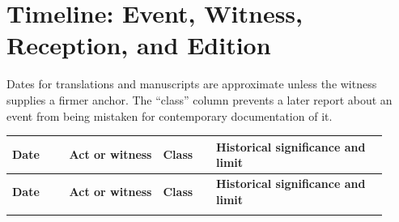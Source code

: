\section{Timeline: Event, Witness, Reception, and Edition}

Dates for translations and manuscripts are approximate unless the witness supplies a firmer anchor. The “class” column prevents a later report about an event from being mistaken for contemporary documentation of it.

\begin{longtable}{>{\bfseries\RaggedRight\arraybackslash}p{0.14\linewidth}>{\RaggedRight\arraybackslash}p{0.23\linewidth}>{\RaggedRight\arraybackslash}p{0.13\linewidth}>{\RaggedRight\arraybackslash}p{0.42\linewidth}}
\toprule
\textbf{Date} & \textbf{Act or witness} & \textbf{Class} & \textbf{Historical significance and limit}\\
\midrule
\endfirsthead
\toprule
\textbf{Date} & \textbf{Act or witness} & \textbf{Class} & \textbf{Historical significance and limit}\\
\midrule
\endhead
\bottomrule
\endfoot


\end{longtable}

